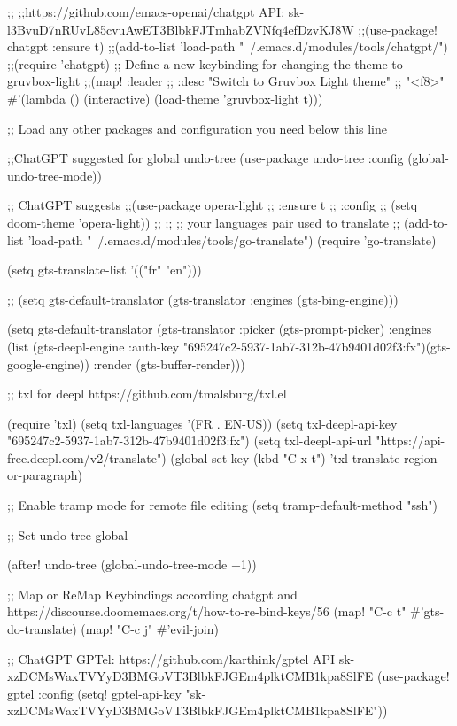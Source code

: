 {{{{{{;;
;;https://github.com/emacs-openai/chatgpt API: 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
;;(use-package! chatgpt :ensure t)
;;(add-to-list 'load-path "~/.emacs.d/modules/tools/chatgpt/")
;;(require 'chatgpt)
;; Define a new keybinding for changing the theme to gruvbox-light
;;(map! :leader
;;    :desc "Switch to Gruvbox Light theme"
;;     "<f8>" #'(lambda () (interactive) (load-theme 'gruvbox-light t)))

;; Load any other packages and configuration you need below this line


;;ChatGPT suggested for global undo-tree
(use-package undo-tree
  :config
  (global-undo-tree-mode))

;; ChatGPT suggests
;;(use-package opera-light
;;  :ensure t
;;  :config
;;  (setq doom-theme 'opera-light))
;;
;;
;; your languages pair used to translate
;;
(add-to-list 'load-path "~/.emacs.d/modules/tools/go-translate")
(require 'go-translate)

(setq gts-translate-list '(("fr" "en")))

;; (setq gts-default-translator (gts-translator :engines (gts-bing-engine)))

(setq gts-default-translator
      (gts-translator
       :picker (gts-prompt-picker)
       :engines (list (gts-deepl-engine :auth-key "695247c2-5937-1ab7-312b-47b9401d02f3:fx")(gts-google-engine))
       :render (gts-buffer-render)))


;; txl for deepl https://github.com/tmalsburg/txl.el

(require 'txl)
(setq txl-languages '(FR . EN-US))
(setq txl-deepl-api-key "695247c2-5937-1ab7-312b-47b9401d02f3:fx")
(setq txl-deepl-api-url "https://api-free.deepl.com/v2/translate")
(global-set-key (kbd "C-x t")   'txl-translate-region-or-paragraph)


;; Enable tramp mode for remote file editing
(setq tramp-default-method "ssh")

;; Set undo tree global

(after! undo-tree
  (global-undo-tree-mode +1))

;; Map or ReMap Keybindings according chatgpt and https://discourse.doomemacs.org/t/how-to-re-bind-keys/56
(map! "C-c t" #'gts-do-translate)
(map! "C-c j" #'evil-join)

;; ChatGPT GPTel: https://github.com/karthink/gptel API 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
(use-package! gptel
 :config
 (setq! gptel-api-key "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"))


}}}}}}
